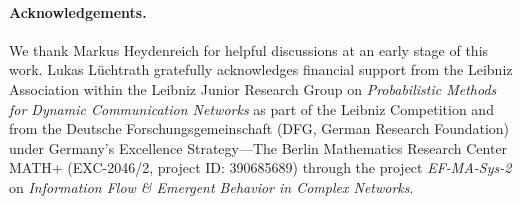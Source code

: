 \documentclass[11pt,a4paper]{scrartcl}
\newcommand{\1}{\mathbb{1}}
\begin{document}
\paragraph{Acknowledgements.}
We thank Markus Heydenreich for helpful discussions at an early stage of this work.
%
Lukas L\"uchtrath gratefully acknowledges financial support from the Leibniz Association within the Leibniz Junior Research Group on \emph{Probabilistic Methods for Dynamic Communication Networks} as part of the Leibniz Competition and from the Deutsche Forschungsgemeinschaft (DFG, German Research Foundation) under Germany's Excellence Strategy---The Berlin Mathematics Research Center MATH+ (EXC-2046/2, project ID: 390685689) through the project \emph{EF-MA-Sys-2} on \emph{Information Flow \& Emergent Behavior in Complex Networks}.

\printbibliography
\end{document}
